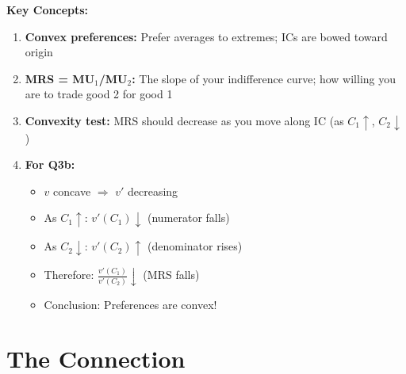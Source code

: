 \documentclass[12pt]{article}
\begin{document}
\begin{tcolorbox}[colback=green!5!white,colframe=green!75!black]
\textbf{Key Concepts:}

\begin{enumerate}[leftmargin=*]
\item \textbf{Convex preferences:} Prefer averages to extremes; ICs are bowed toward origin

\item \textbf{MRS = MU$_1$/MU$_2$:} The slope of your indifference curve; how willing you are to trade good 2 for good 1

\item \textbf{Convexity test:} MRS should decrease as you move along IC (as $C_1 \uparrow$, $C_2 \downarrow$)

\item \textbf{For Q3b:}
\begin{itemize}
\item $v$ concave $\Rightarrow$ $v'$ decreasing
\item As $C_1 \uparrow$: $v'(C_1) \downarrow$ (numerator falls)
\item As $C_2 \downarrow$: $v'(C_2) \uparrow$ (denominator rises)
\item Therefore: $\frac{v'(C_1)}{v'(C_2)} \downarrow$ (MRS falls)
\item Conclusion: Preferences are convex!
\end{itemize}
\end{enumerate}
\end{tcolorbox}

\section*{The Connection}

\begin{center}
\end{center}
\end{document}
